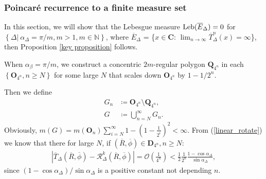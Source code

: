 \documentclass{article}
\numberwithin{figure}{section}
\numberwithin{equation}{section}
\theoremstyle{remark}
\theoremstyle{definition}
\begin{document}
\subsubsection{Poincar\'{e} recurrence to a finite measure set}
In this section, we will show that the Lebesgue measure ${\rm Leb}(\overline{E}_{\Delta})=0$ for $\left\{\Delta|\ \alpha_{\Delta}=\pi/m, m>1,m \in \mathbb{N} \right\}$, where \(\overline{E}_{\Delta}\) = \{\(x\in\textbf{C}\): $\lim_{n \to \infty}\overline{T}_{\Delta}^n(x)=\infty$\}, then Proposition \ref{key proposition} follows.

When $\alpha_\beta=\pi/m$, we construct a concentric $2m$-regular polygon $\textbf{Q}_{4^n}$ in each $\left\{\textbf{O}_{4^n},n\geq N\right\}$ for some large $N$ that scales down $\textbf{O}_{4^n}$ by $1-1/2^n$. 

Then we define
\begin{align*}
	G_n&\coloneqq \textbf{O}_{4^n}\setminus\textbf{Q}_{4^n},\\
	G&\coloneqq \bigcup_{n=N}^{\infty}G_n.
\end{align*}
Obviously, $m(G)=m\left(\textbf{O}_n\right)\sum_{i=N}^{\infty}1-\left({1-\frac{1}{2^{i}}}\right)^2<\infty$. From (\ref{linear_rotate}) we know that there for large $N$, if $(\overline{R},\overline{\phi})\in\textbf{D}_{4^n},n\geq N$:
\begin{align}\label{estimate}
	\left|\overline{T}_\Delta(\overline{R},\overline{\phi})-\mathcal{R}^k_\Delta(\overline{R},\overline{\phi})\right|=\mathcal{O}\left({\frac{1}{4^n}}\right)<\frac{1}{2}\frac{1}{2^n}\frac{1-\cos\alpha_\Delta}{\sin\alpha_\Delta},
\end{align}
since $\left(1-\cos\alpha_\Delta\right)/{\sin\alpha_\Delta}$ is a positive constant not depending $n$.
\end{document}
